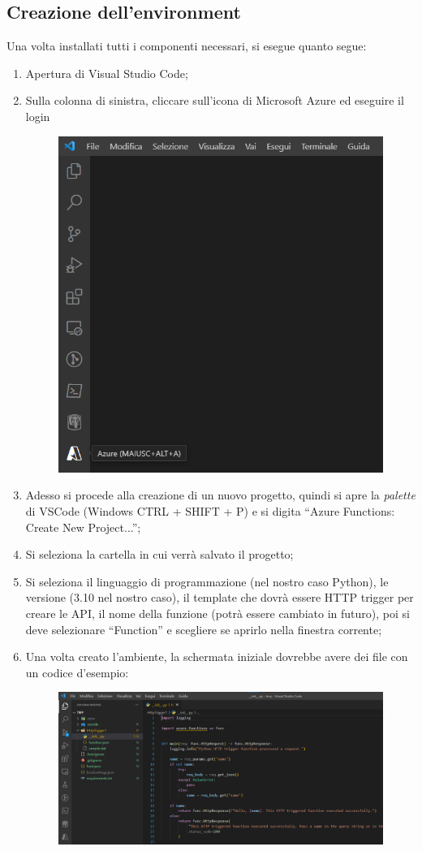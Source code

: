 \documentclass[a4paper]{article}
\newcommand{\dquotes}[1]{``#1''}
\begin{document}
	\subsection{Creazione dell'environment}
	
	Una volta installati tutti i componenti necessari, si esegue quanto segue:
	\begin{enumerate}
		\item Apertura di Visual Studio Code;
		
		\item Sulla colonna di sinistra, cliccare sull'icona di Microsoft Azure ed eseguire il login
		\begin{figure}[!htp]
			\centering
			\includegraphics[width=.4\textwidth]{img/azure-1.png}
		\end{figure}
		
		\item Adesso si procede alla creazione di un nuovo progetto, quindi si apre la \emph{palette} di VSCode (Windows CTRL + SHIFT + P) e si digita \dquotes{\textsf{Azure Functions: Create New Project...}};
		
		\item Si seleziona la cartella in cui verrà salvato il progetto;
		
		\item Si seleziona il linguaggio di programmazione (nel nostro caso Python), le versione (3.10 nel nostro caso), il template che dovrà essere HTTP trigger per creare le API, il nome della funzione (potrà essere cambiato in futuro), poi si deve selezionare \dquotes{\textsf{Function}} e scegliere se aprirlo nella finestra corrente;
		
		\item Una volta creato l'ambiente, la schermata iniziale dovrebbe avere dei file con un codice d'esempio:
		\begin{figure}[!htp]
			\centering
			\includegraphics[width=\linewidth]{img/azure-2.png}
		\end{figure}
	\end{enumerate}\newpage
	
\end{document}
